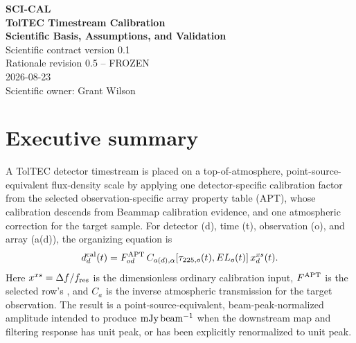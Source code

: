 \documentclass[11pt]{article}
\begin{document}
\hypersetup{pageanchor=false}
\begin{titlepage}
\centering\vspace*{0.55in}
{\Large\color{calteal}\textbf{SCI-CAL}}\\[0.18in]
{\huge\color{calblue}\textbf{TolTEC Timestream Calibration}}\\[0.08in]
{\LARGE\color{calblue}\textbf{Scientific Basis, Assumptions, and Validation}}\\[0.38in]
{\large Scientific contract version 0.1}\\[0.06in]
{\large Rationale revision 0.5 -- FROZEN}\\[0.10in]
{\large 2026-08-23}\\[0.50in]
\vfill {\large Scientific owner: Grant Wilson}
\end{titlepage}
\hypersetup{pageanchor=true}

\section*{Executive summary}
A TolTEC detector timestream is placed on a top-of-atmosphere,
point-source-equivalent flux-density scale by applying one detector-specific
calibration factor from the selected observation-specific array property table
(APT), whose calibration descends from Beammap calibration evidence, and one
atmospheric correction for the target sample. For detector (d), time
(t), observation (o), and array (a(d)), the organizing equation is
\begin{equation}
 d^{\rm cal}_d(t)=F^{\rm APT}_{od}\,
 C_{a(d),\alpha}\!\left[\tau_{225,o}(t),EL_o(t)\right]x^{xs}_d(t).
 \label{eq:science-central}
\end{equation}
Here \(x^{xs}=\Delta f/f_{\rm res}\) is the dimensionless ordinary 
calibration
input, \(F^{\rm APT}\) is the selected row's , and \(C_a\) is
the inverse atmospheric transmission for the target observation. The result
is a point-source-equivalent, beam-peak-normalized amplitude intended to
produce \(\mathrm{mJy\,beam^{-1}}\) when the downstream map and filtering response has unit
peak, or has been explicitly renormalized to unit peak.
\end{document}
